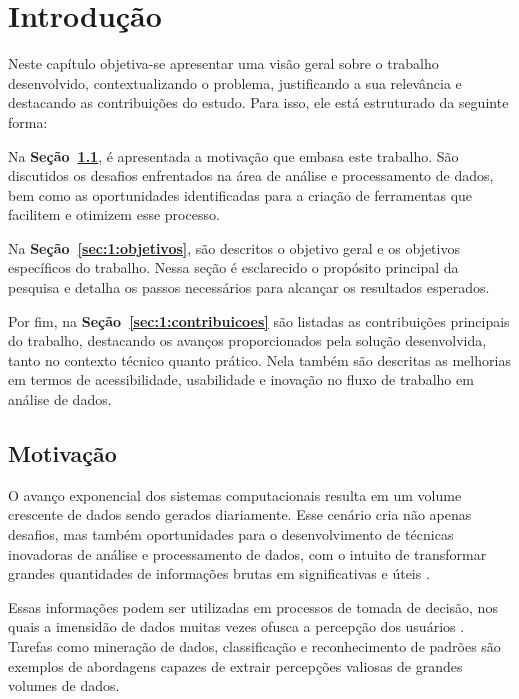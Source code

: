 
\chapter{Introdução}
\label{cap:1:introducao}

Neste capítulo objetiva-se apresentar uma visão geral sobre o trabalho desenvolvido, contextualizando o problema, justificando a sua relevância e destacando as contribuições do estudo. Para isso, ele está estruturado da seguinte forma:

Na \textbf{Seção~\ref{sec:1:motivacao}}, é apresentada a motivação que embasa este trabalho. São discutidos os desafios enfrentados na área de análise e processamento de dados, bem como as oportunidades identificadas para a criação de ferramentas que facilitem e otimizem esse processo.

Na \textbf{Seção~\ref{sec:1:objetivos}}, são descritos o objetivo geral e os objetivos específicos do trabalho. Nessa seção é esclarecido o propósito principal da pesquisa e detalha os passos necessários para alcançar os resultados esperados.

Por fim, na \textbf{Seção~\ref{sec:1:contribuicoes}} são listadas as contribuições principais do trabalho, destacando os avanços proporcionados pela solução desenvolvida, tanto no contexto técnico quanto prático. Nela também são descritas as melhorias em termos de acessibilidade, usabilidade e inovação no fluxo de trabalho em análise de dados.

\section{Motivação}
\label{sec:1:motivacao}

O avanço exponencial dos sistemas computacionais resulta em um volume crescente de dados sendo gerados diariamente. Esse cenário cria não apenas desafios, mas também oportunidades para o desenvolvimento de técnicas inovadoras de análise e processamento de dados, com o intuito de transformar grandes quantidades de informações brutas em significativas e úteis \citep{tarapanoff1995tecnicas}.

Essas informações podem ser utilizadas em processos de tomada de decisão, nos quais a imensidão de dados muitas vezes ofusca a percepção dos usuários \citep{han_data_mining}. Tarefas como mineração de dados, classificação e reconhecimento de padrões são exemplos de abordagens capazes de extrair percepções valiosas de grandes volumes de dados.

